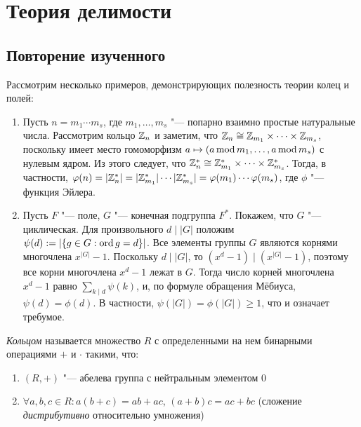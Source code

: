 \section{Теория делимости}

\subsection{Повторение изученного}

\begin{example}
	Рассмотрим несколько примеров, демонстрирующих полезность теории колец и полей:
	\begin{enumerate}
		\item Пусть $n = m_1 \dotsm m_s$, где $m_1, \dotsc, m_s$ "--- попарно взаимно простые натуральные числа. Рассмотрим кольцо $\mathbb{Z}_n$ и заметим, что $\mathbb{Z}_n \cong \mathbb{Z}_{m_1} \times \dotsb \times \mathbb{Z}_{m_s}$, поскольку имеет место гомоморфизм $a \mapsto (a \operatorname{mod} m_1, \dotsc, a \operatorname{mod} m_s)$ с нулевым ядром. Из этого следует, что $\mathbb{Z}_n^* \cong \mathbb{Z}_{m_1}^* \times \dotsb \times \mathbb{Z}_{m_s}^*$. Тогда, в частности, $\phi(n) =  |\Z_n^*| \hm= |\Z_{m_1}^*|\dotsm|\Z_{m_s}^*| \hm= \phi(m_1)\dotsm\phi(m_s)$, где $\phi$ "--- функция Эйлера.
		\item Пусть $F$ "--- поле, $G$ "--- конечная подгруппа $F^*$. Покажем, что $G$ "--- циклическая. Для произвольного $d\mid |G|$ положим $\psi(d) := |\{g \in G: \operatorname{ord}{g} = d\}|$. Все элементы группы $G$ являются корнями многочлена $x^{|G|} - 1$. Поскольку $d\mid |G|$, то $(x^{d} - 1) \mid (x^{|G|} - 1)$, поэтому все корни многочлена $x^d - 1$ лежат в $G$. Тогда число корней многочлена $x^d - 1$ равно $\sum_{k \mid d} \psi(k)$, и, по формуле обращения Мёбиуса, $\psi(d) = \phi(d)$. В частности, $\psi(|G|) = \phi(|G|) \ge 1$, что и означает требумое.
	\end{enumerate}
\end{example}

\begin{definition}
	\textit{Кольцом} называется множество $R$ с определенными на нем бинарными операциями $+$ и $\cdot$ такими, что:
	\begin{enumerate}
		\item $(R, +)$ "--- абелева группа с нейтральным элементом 0
		\item $\forall a, b, c \in R: a(b + c) = ab + ac$, $(a + b)c = ac + bc$ (сложение \textit{дистрибутивно} относительно умножения)
	\end{enumerate}
\end{definition}

